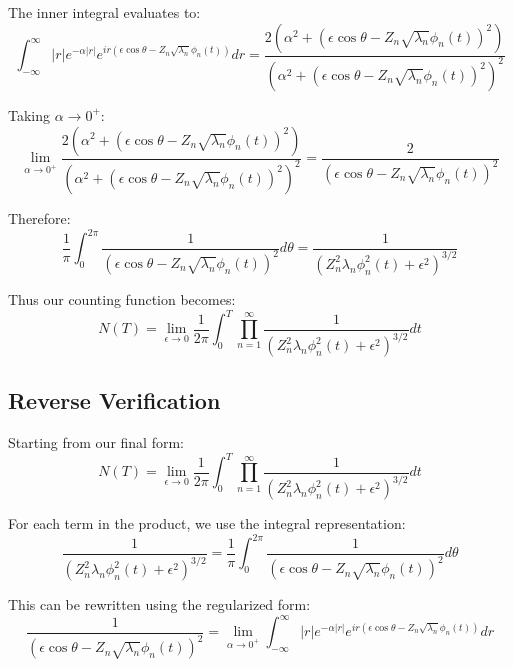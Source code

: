 \documentclass{article}
\begin{document}
The inner integral evaluates to:
\begin{equation}
    \int_{-\infty}^{\infty} |r|e^{-\alpha|r|} e^{ir(\epsilon\cos\theta - Z_n \sqrt{\lambda_n} \phi_n(t))} dr = \frac{2(\alpha^2 + (\epsilon\cos\theta - Z_n \sqrt{\lambda_n} \phi_n(t))^2)}{(\alpha^2 + (\epsilon\cos\theta - Z_n \sqrt{\lambda_n} \phi_n(t))^2)^2}
\end{equation}

Taking $\alpha \to 0^+$:
\begin{equation}
    \lim_{\alpha \to 0^+} \frac{2(\alpha^2 + (\epsilon\cos\theta - Z_n \sqrt{\lambda_n} \phi_n(t))^2)}{(\alpha^2 + (\epsilon\cos\theta - Z_n \sqrt{\lambda_n} \phi_n(t))^2)^2} = \frac{2}{(\epsilon\cos\theta - Z_n \sqrt{\lambda_n} \phi_n(t))^2}
\end{equation}

Therefore:
\begin{equation}
    \frac{1}{\pi} \int_0^{2\pi} \frac{1}{(\epsilon\cos\theta - Z_n \sqrt{\lambda_n} \phi_n(t))^2} d\theta = \frac{1}{(Z_n^2\lambda_n\phi_n^2(t) + \epsilon^2)^{3/2}}
\end{equation}

Thus our counting function becomes:
\begin{equation}
    N(T) = \lim_{\epsilon \to 0} \frac{1}{2\pi} \int_0^T \prod_{n=1}^{\infty} \frac{1}{(Z_n^2\lambda_n\phi_n^2(t) + \epsilon^2)^{3/2}} dt
\end{equation}

\subsection{Reverse Verification}
Starting from our final form:
\begin{equation}
    N(T) = \lim_{\epsilon \to 0} \frac{1}{2\pi} \int_0^T \prod_{n=1}^{\infty} \frac{1}{(Z_n^2\lambda_n\phi_n^2(t) + \epsilon^2)^{3/2}} dt
\end{equation}

For each term in the product, we use the integral representation:
\begin{equation}
    \frac{1}{(Z_n^2\lambda_n\phi_n^2(t) + \epsilon^2)^{3/2}} = \frac{1}{\pi} \int_0^{2\pi} \frac{1}{(\epsilon\cos\theta - Z_n \sqrt{\lambda_n} \phi_n(t))^2} d\theta
\end{equation}

This can be rewritten using the regularized form:
\begin{equation}
    \frac{1}{(\epsilon\cos\theta - Z_n \sqrt{\lambda_n} \phi_n(t))^2} = \lim_{\alpha \to 0^+} \int_{-\infty}^{\infty} |r|e^{-\alpha|r|} e^{ir(\epsilon\cos\theta - Z_n \sqrt{\lambda_n} \phi_n(t))} dr
\end{equation}
\end{document}
